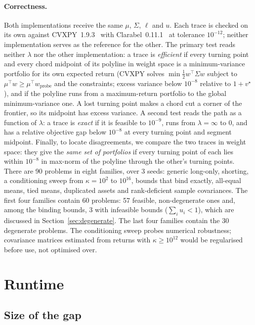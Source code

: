 \documentclass[11pt,a4paper]{article}
\begin{document}
\paragraph{Correctness.} Both implementations receive the same $\mu$,
$\Sigma$, $\ell$ and $u$. Each trace is checked on its own against
CVXPY~1.9.3~\cite{cvxpy} with Clarabel~0.11.1~\cite{clarabel} at tolerance
$10^{-12}$; neither implementation serves as the reference for the other.
The primary test reads neither $\lambda$ nor the other implementation: a
trace is \emph{efficient} if every turning point and every chord midpoint of
its polyline in weight space is a minimum-variance portfolio for its own
expected return (CVXPY solves $\min \tfrac12 w^\top\Sigma w$ subject to
$\mu^\top w \ge \mu^\top w_{\text{probe}}$ and the constraints; excess
variance below $10^{-8}$ relative to $1 + v^\star$), and if the polyline runs
from a maximum-return portfolio to the global minimum-variance one. A lost
turning point makes a chord cut a corner of the frontier, so its midpoint has
excess variance. A second test reads the path as a function of $\lambda$: a
trace is \emph{exact} if it is feasible to $10^{-9}$, runs from
$\lambda = \infty$ to 0, and has a relative objective gap below $10^{-8}$ at
every turning point and segment midpoint. Finally, to locate disagreements,
we compare the two traces in weight space: they give the \emph{same set of
portfolios} if every turning point of each lies within $10^{-8}$ in max-norm
of the polyline through the other's turning points. There are 90 problems in eight
families, over 3 seeds: generic long-only, shorting, a conditioning sweep from
$\kappa = 10^{2}$ to $10^{16}$, bounds that bind exactly, all-equal means, tied
means, duplicated assets and rank-deficient sample covariances. The first four
families contain 60 problems: 57 feasible, non-degenerate ones and, among the
binding bounds, 3 with infeasible bounds ($\sum_i u_i < 1$), which are
discussed in Section~\ref{sec:degenerate}. The last four families contain the
30 degenerate problems. The conditioning sweep
probes numerical robustness; covariance matrices estimated from returns with
$\kappa \ge 10^{12}$ would be regularised before use, not optimised over.

\section{Runtime}\label{sec:runtime}

\subsection{Size of the gap}
\end{document}
